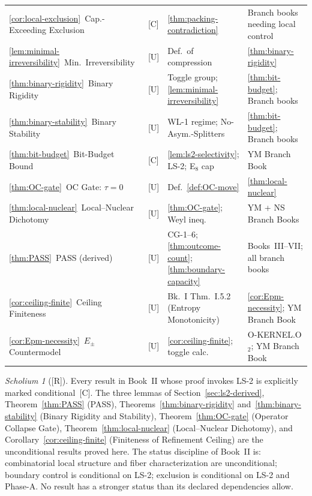 \documentclass[12pt,oneside]{amsbook}
\theoremstyle{plain}
\theoremstyle{definition}
\theoremstyle{remark}
\newtheorem{scholium}[theorem]{Scholium}
\newcommand{\status}[1]{\textup{[#1]}}
\begin{document}
\begin{tabular}{@{}p{3.6cm}p{0.8cm}p{3.8cm}p{4.8cm}@{}}
\ref{cor:local-exclusion}\ Cap.-Exceeding Exclusion
  & [C] & \ref{thm:packing-contradiction}
  & Branch books needing local control \\

\ref{lem:minimal-irreversibility}\ Min.\ Irreversibility
  & [U] & Def.\ of compression
  & \ref{thm:binary-rigidity} \\

\ref{thm:binary-rigidity}\ Binary Rigidity
  & [U] & Toggle group; \ref{lem:minimal-irreversibility}
  & \ref{thm:bit-budget}; Branch books \\

\ref{thm:binary-stability}\ Binary Stability
  & [U] & WL-1 regime; No-Asym.-Splitters
  & \ref{thm:bit-budget}; Branch books \\

\ref{thm:bit-budget}\ Bit-Budget Bound
  & [C] & \ref{lem:ls2-selectivity}; LS-2; E${}_8$ cap
  & YM Branch Book \\

\ref{thm:OC-gate}\ OC Gate: $\tau=0$
  & [U] & Def.~\ref{def:OC-move}
  & \ref{thm:local-nuclear} \\

\ref{thm:local-nuclear}\ Local--Nuclear Dichotomy
  & [U] & \ref{thm:OC-gate}; Weyl ineq.
  & YM + NS Branch Books \\

\ref{thm:PASS}\ PASS (derived)
  & [U] & CG-1--6; \ref{thm:outcome-count}; \ref{thm:boundary-capacity}
  & Books~III--VII; all branch books \\

\ref{cor:ceiling-finite}\ Ceiling Finiteness
  & [U] & Bk.~I Thm.~I.5.2 (Entropy Monotonicity)
  & \ref{cor:Epm-necessity}; YM Branch Book \\

\ref{cor:Epm-necessity}\ $E_\pm$ Countermodel
  & [U] & \ref{cor:ceiling-finite}; toggle calc.
  & O-KERNEL.O${}_2$; YM Branch Book \\
\hline
\end{tabular}
\normalsize
\renewcommand{\arraystretch}{1}

\medskip

\begin{scholium}[\status{R}]
Every result in Book~II whose proof invokes LS-2 is explicitly marked
conditional~[C].  The three lemmas of Section~\ref{sec:ls2-derived},
Theorem~\ref{thm:PASS} (PASS), Theorems~\ref{thm:binary-rigidity}
and~\ref{thm:binary-stability} (Binary Rigidity and Stability),
Theorem~\ref{thm:OC-gate} (Operator Collapse Gate),
Theorem~\ref{thm:local-nuclear} (Local--Nuclear Dichotomy), and
Corollary~\ref{cor:ceiling-finite} (Finiteness of Refinement Ceiling)
are the unconditional results proved here.  The status discipline of
Book~II is: combinatorial local structure and fiber characterization are
unconditional; boundary control is conditional on LS-2; exclusion is
conditional on LS-2 and Phase-A.  No result has a stronger status than
its declared dependencies allow.
\end{scholium}
\end{document}
